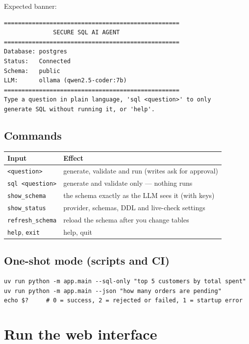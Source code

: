 \documentclass[11pt,a4paper]{article}
\begin{document}
Expected banner:

\begin{lstlisting}
==================================================
              SECURE SQL AI AGENT
==================================================
Database: postgres
Status:   Connected
Schema:   public
LLM:      ollama (qwen2.5-coder:7b)
==================================================
Type a question in plain language, 'sql <question>' to only
generate SQL without running it, or 'help'.
\end{lstlisting}

\subsection{Commands}

\begin{center}
\begin{tabular}{@{}ll@{}}
\toprule
\textbf{Input} & \textbf{Effect} \\
\midrule
\texttt{<question>}      & generate, validate and run (writes ask for approval) \\
\texttt{sql <question>}  & generate and validate only --- nothing runs \\
\texttt{show\_schema}    & the schema exactly as the LLM sees it (with keys) \\
\texttt{show\_status}    & provider, schemas, DDL and live-check settings \\
\texttt{refresh\_schema} & reload the schema after you change tables \\
\texttt{help}, \texttt{exit} & help, quit \\
\bottomrule
\end{tabular}
\end{center}

\subsection{One-shot mode (scripts and CI)}

\begin{lstlisting}
uv run python -m app.main --sql-only "top 5 customers by total spent"
uv run python -m app.main --json "how many orders are pending"
echo $?     # 0 = success, 2 = rejected or failed, 1 = startup error
\end{lstlisting}

\section{Run the web interface}
\label{sec:web}
\end{document}
